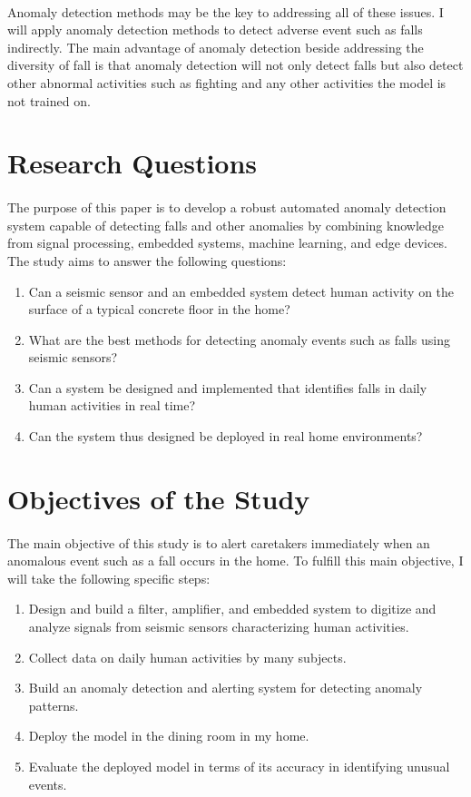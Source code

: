 \paragraph{}
Anomaly detection methods may be the key to addressing all of these issues. I will apply  anomaly detection methods to detect adverse event such as falls indirectly. The main advantage of anomaly detection beside addressing the diversity of fall is that anomaly detection will not only detect falls but also detect other abnormal activities such as fighting and any other activities the model is not trained on.


\section{Research Questions}
\paragraph{}
The purpose of this paper is to develop a robust automated anomaly detection system capable of detecting falls and other anomalies by combining knowledge from signal processing, embedded systems, machine learning, and edge devices. The study aims to answer the following questions:
\begin{enumerate}
\item Can a seismic sensor and an embedded system detect human activity on the surface of a typical concrete floor in the home?
\item What are the best methods for detecting anomaly events such as falls using seismic sensors?
\item Can a system be designed and implemented that identifies falls in daily human activities in real time?
\item Can the system thus designed be deployed in real home environments?
\end{enumerate}

\section{Objectives of the Study}
\paragraph{}
The main objective of this study is to alert caretakers immediately when an anomalous event such as a fall occurs in the home. To fulfill this main objective, I will take the following specific steps:
\begin{enumerate}
\item Design and build a filter, amplifier, and embedded system to digitize and analyze signals from seismic sensors characterizing human activities.
\item Collect data on daily human activities by many subjects.
\item Build an anomaly detection and alerting system for detecting anomaly patterns.
\item Deploy the model in the dining room in my home.
\item Evaluate the deployed model in terms of its accuracy in identifying unusual events.
\end{enumerate}

